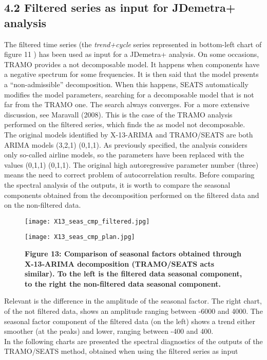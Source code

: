 \documentclass{article}
\begin{document}
\subsection*{\small 4.2 Filtered series as input for JDemetra+ analysis}
The filtered time series (the \textit{trend+cycle} series represented in bottom-left chart of figure 11 ) has been used as input for a JDemetra+ analysis. On some occasions, TRAMO provides a not decomposable model. It happens when components have a negative spectrum for some frequencies. It is then said that the model presents a “non-admissible” decomposition. When this happens, SEATS automatically modifies the model parameters, searching for a decomposable model that is not far from the TRAMO one. The search always converges. For a more extensive discussion, see Maravall (2008). This is the case of the TRAMO analysis performed on the filtered series, which finds the as model not decomposable.\\ {\color{green}The original models identified by X-13-ARIMA and TRAMO/SEATS are both ARIMA models (3,2,1) (0,1,1). As previously specified, the analysis considers only so-called airline models, so the parameters have been replaced with the values (0,1,1) (0,1,1). The original high autoregressive parameter number (three) means the need to correct problem of autocorrelation results.} Before comparing the spectral analysis of the outputs, it is worth to compare the seasonal components obtained from the decomposition performed on the filtered data and on the non-filtered data.
\begin{figure}[H]
  \begin{minipage}[b]{0.5\textwidth}
    \texttt{[image: X13\_seas\_cmp\_filtered.jpg]}
  \end{minipage}
  \hfill
  \begin{minipage}[b]{0.5\textwidth}
    \texttt{[image: X13\_seas\_cmp\_plan.jpg]}
  \end{minipage}
  {\textbf{\scriptsize Figure 13: Comparison of seasonal factors obtained through X-13-ARIMA decomposition (TRAMO/SEATS acts similar). To the left is the filtered data seasonal component, to the right the non-filtered data seasonal component.}}
\end{figure}
Relevant is the difference in the amplitude of the seasonal factor. The right chart, of the not filtered data, shows an amplitude ranging between -6000 and 4000. The seasonal factor component of the filtered data (on the left) shows a trend either smoother (at the peaks) and lower, ranging between -400 and 400.\\In the following charts are presented the spectral diagnostics of the outputs of the TRAMO/SEATS method, obtained when using the filtered series as input
\end{document}
